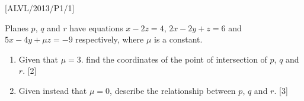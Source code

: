 \item {[}ALVL/2013/P1/1{]}

Planes $p$, $q$ and $r$ have equations $x-2z=4$, $2x-2y+z=6$
and $5x-4y+\mu z=-9$ respectively, where $\mu$ is a constant. 
\begin{enumerate}
\item Given that $\mu=3$. find the coordinates of the point of intersection
of $p$, $q$ and $r$. \hfill{}{[}2{]}
\item Given instead that $\mu=0$, describe the relationship between $p$,
$q$ and $r$. \hfill{} {[}3{]}
\end{enumerate}
